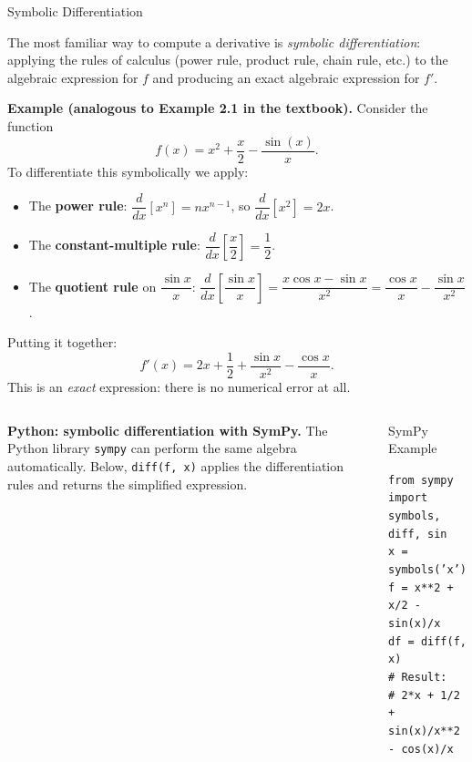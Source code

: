 \documentclass[aspectratio=169,10pt]{beamer}
\begin{document}
\begin{frame}[allowframebreaks]{Symbolic Differentiation}

  The most familiar way to compute a derivative is \emph{symbolic
  differentiation}: applying the rules of calculus (power rule, product
  rule, chain rule, etc.) to the algebraic expression for $f$ and
  producing an exact algebraic expression for $f'$.

  \medskip
  \textbf{Example (analogous to Example 2.1 in the textbook).}
  Consider the function
  \[
    f(x) = x^2 + \frac{x}{2} - \frac{\sin(x)}{x}.
  \]
  To differentiate this symbolically we apply:
  \begin{itemize}
    \item The \textbf{power rule}: $\dfrac{d}{dx}[x^n] = nx^{n-1}$,
          so $\dfrac{d}{dx}[x^2] = 2x$.
    \item The \textbf{constant-multiple rule}: $\dfrac{d}{dx}\!\left[\dfrac{x}{2}\right]
          = \dfrac{1}{2}$.
    \item The \textbf{quotient rule} on $\dfrac{\sin x}{x}$:
          $\dfrac{d}{dx}\!\left[\dfrac{\sin x}{x}\right]
          = \dfrac{x\cos x - \sin x}{x^2}
          = \dfrac{\cos x}{x} - \dfrac{\sin x}{x^2}$.
  \end{itemize}

  Putting it together:
  \[
    f'(x) = 2x + \frac{1}{2} + \frac{\sin x}{x^2} - \frac{\cos x}{x}.
  \]
  This is an \emph{exact} expression: there is no numerical error at all.

  \framebreak

  \begin{columns}[T]
    \textbf{Python: symbolic differentiation with SymPy.}
    The Python library \texttt{sympy} can perform the same algebra
    automatically.  Below, \texttt{diff(f, x)} applies the differentiation
    rules and returns the simplified expression.

    \begin{block}{SymPy Example}
      \ttfamily\small
      \begin{tabbing}
        \texttt{from sympy import symbols, diff, sin}\\
        \texttt{x = symbols('x')}\\
        \texttt{f = x**2 + x/2 - sin(x)/x}\\
        \texttt{df = diff(f, x)}\\
        \texttt{\# Result:}\\
        \texttt{\# 2*x + 1/2 + sin(x)/x**2 - cos(x)/x}
      \end{tabbing}
    \end{block}


\end{columns}
\end{frame}
\end{document}
